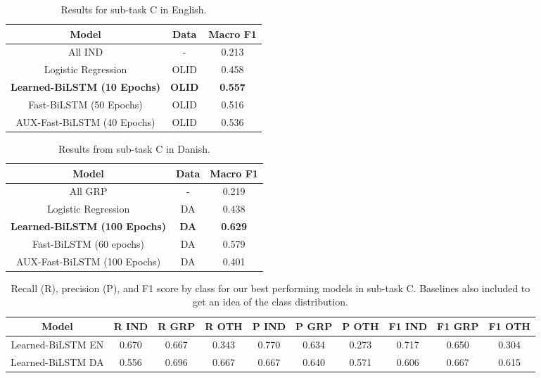 \documentclass{article}
\begin{document}
\begin{table}
\small
\centering
\caption{Results for sub-task C in English.}\label{table:subCEN}
\begin{tabular}{c|c|c}
\textbf{Model}                      & \textbf{Data} & \textbf{Macro F1} \\\hline
All IND                             & -                  & 0.213             \\
Logistic Regression                 & OLID               & 0.458             \\
\textbf{Learned-BiLSTM (10 Epochs)} & \textbf{OLID}      & \textbf{0.557}    \\
Fast-BiLSTM (50 Epochs)             & OLID               & 0.516             \\
AUX-Fast-BiLSTM (40 Epochs)         & OLID               & 0.536             \\
\end{tabular}
\end{table}

\begin{table}
\small
\centering
\caption{Results from  sub-task C in Danish.}\label{table:subCDA}
\begin{tabular}{c|c|c}
\textbf{Model}                       & \textbf{Data} & \textbf{Macro F1} \\\hline
All GRP                              & -                  & 0.219             \\
Logistic Regression                  & DA                 & 0.438             \\
\textbf{Learned-BiLSTM (100 Epochs)} & \textbf{DA}        & \textbf{0.629}    \\
Fast-BiLSTM (60 epochs)              & DA                 & 0.579             \\
AUX-Fast-BiLSTM (100 Epochs)         & DA                 & 0.401             \\
\end{tabular}
\end{table}



\begin{table*}
\centering \small
\caption{Recall (R), precision (P), and F1 score by class for our best performing models in sub-task C. Baselines also included to get an idea of the class distribution.}
\begin{tabular}{c|c|c|c|c|c|c|c|c|c}
\textbf{Model}               & \textbf{R IND} & \textbf{R GRP} & \textbf{R OTH} & \textbf{P IND} & \textbf{P GRP} & \textbf{P OTH} & \textbf{F1 IND} & \textbf{F1 GRP} & \textbf{F1 OTH} \\\hline
Learned-BiLSTM EN& 0.670 & 0.667 & 0.343 & 0.770 & 0.634 & 0.273 & 0.717  & 0.650  & 0.304  \\
Learned-BiLSTM DA& 0.556 & 0.696 & 0.667 & 0.667 & 0.640 & 0.571 & 0.606  & 0.667  & 0.615 \\
\end{tabular}
\label{table:subCBest}
\end{table*}
\end{document}
